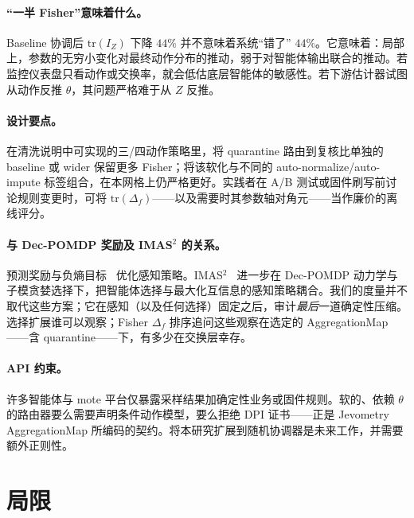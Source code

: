 \documentclass[11pt,a4paper]{article}
\begin{document}
\paragraph{“一半 Fisher”意味着什么。}
Baseline 协调后 $\mathrm{tr}(I_Z)$ 下降 $44\%$ 并不意味着系统“错了” $44\%$。它意味着：局部上，参数的无穷小变化对最终动作分布的推动，弱于对智能体输出联合的推动。若监控仪表盘只看动作或交换率，就会低估底层智能体的敏感性。若下游估计器试图从动作反推 $\theta$，其问题严格难于从 $Z$ 反推。

\paragraph{设计要点。}
在清洗说明中可实现的三/四动作策略里，将 quarantine 路由到复核比单独的 baseline 或 wider 保留更多 Fisher；将该软化与不同的 auto-normalize/auto-impute 标签组合，在本网格上仍严格更好。实践者在 A/B 测试或固件刷写前讨论规则变更时，可将 $\mathrm{tr}(\Delta_f)$——以及需要时其参数轴对角元——当作廉价的离线评分。

\paragraph{与 Dec-POMDP 奖励及 IMAS$^2$ 的关系。}
预测奖励与负熵目标~\citep{lauri2020prediction,lauri2020decpomdp} 优化感知策略。IMAS$^2$~\citep{shi2026imas2} 进一步在 Dec-POMDP 动力学与子模贪婪选择下，把智能体选择与最大化互信息的感知策略耦合。我们的度量并不取代这些方案；它在感知（以及任何选择）固定之后，审计\emph{最后}一道确定性压缩。选择扩展谁可以观察；Fisher $\Delta_f$ 排序追问这些观察在选定的 AggregationMap——含 quarantine——下，有多少在交换层幸存。

\paragraph{API 约束。}
许多智能体与 mote 平台仅暴露采样结果加确定性业务或固件规则。软的、依赖 $\theta$ 的路由器要么需要声明条件动作模型，要么拒绝 DPI 证书——正是 Jevometry AggregationMap 所编码的契约。将本研究扩展到随机协调器是未来工作，并需要额外正则性。

\section{局限}
\label{sec:limitations}
\end{document}
